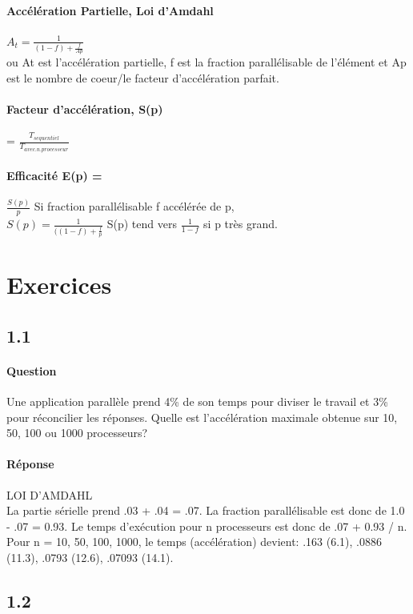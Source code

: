 \documentclass[oneside]{book}
\begin{document}
\paragraph{Accélération Partielle, Loi d'Amdahl} 
$A_t = \frac{1}{(1-f) + \frac{f}{Ap}}$\\
ou At est l'accélération partielle, f est la fraction parallélisable de l'élément et Ap est le nombre de coeur/le facteur d'accélération parfait.\\
\paragraph{Facteur d'accélération, S(p)}= $\frac{T_{sequentiel}}{T_{avec.n.processeur}}$

\paragraph{Efficacité E(p) = } $\frac{S(p)}{p}$
Si fraction parallélisable f accélérée de p, \\
$S(p) = \frac{1}{((1-f) + \frac{f}{p}}$ S(p) tend vers $\frac{1}{1-f}$ si p très grand.
\newpage

\section{Exercices}
\subsection{1.1}
\paragraph{Question}
Une application parallèle prend 4\% de son temps pour diviser le travail et 3\% pour
réconcilier les réponses. Quelle est l'accélération maximale obtenue sur 10, 50,
100 ou 1000 processeurs?
\paragraph{Réponse}
LOI D'AMDAHL\\
La partie sérielle prend .03 + .04 = .07. La fraction parallélisable est donc de 1.0 -
.07 = 0.93. Le temps d'exécution pour n processeurs est donc de .07 + 0.93 / n.\\
Pour n = 10, 50, 100, 1000, le temps (accélération) devient:
.163 (6.1), .0886 (11.3), .0793 (12.6), .07093 (14.1).

\subsection{1.2}
\end{document}
